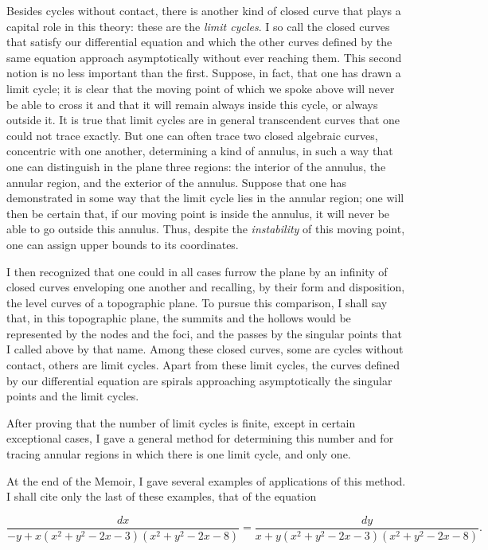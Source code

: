 \documentclass[11pt]{article}
\begin{document}
Besides cycles without contact, there is another kind of closed curve that plays a capital role in this theory: these are the \emph{limit cycles}. I so call the closed curves that satisfy our differential equation and which the other curves defined by the same equation approach asymptotically without ever reaching them. This second notion is no less important than the first. Suppose, in fact, that one has drawn a limit cycle; it is clear that the moving point of which we spoke above will never be able to cross it and that it will remain always inside this cycle, or always outside it. It is true that limit cycles are in general transcendent curves that one could not trace exactly. But one can often trace two closed algebraic curves, concentric with one another, determining a kind of annulus, in such a way that one can distinguish in the plane three regions: the interior of the annulus, the annular region, and the exterior of the annulus. Suppose that one has demonstrated in some way that the limit cycle lies in the annular region; one will then be certain that, if our moving point is inside the annulus, it will never be able to go outside this annulus. Thus, despite the \emph{instability} of this moving point, one can assign upper bounds to its coordinates.

I then recognized that one could in all cases furrow the plane by an infinity of closed curves enveloping one another and recalling, by their form and disposition, the level curves of a topographic plane. To pursue this comparison, I shall say that, in this topographic plane, the summits and the hollows would be represented by the nodes and the foci, and the passes by the singular points that I called above by that name. Among these closed curves, some are cycles without contact, others are limit cycles. Apart from these limit cycles, the curves defined by our differential equation are spirals approaching asymptotically the singular points and the limit cycles.

After proving that the number of limit cycles is finite, except in certain exceptional cases, I gave a general method for determining this number and for tracing annular regions in which there is one limit cycle, and only one.

At the end of the Memoir, I gave several examples of applications of this method. I shall cite only the last of these examples, that of the equation

\[
\frac{dx}{-y+x(x^2+y^2-2x-3)(x^2+y^2-2x-8)}=
\frac{dy}{x+y(x^2+y^2-2x-3)(x^2+y^2-2x-8)}.
\]
\end{document}
